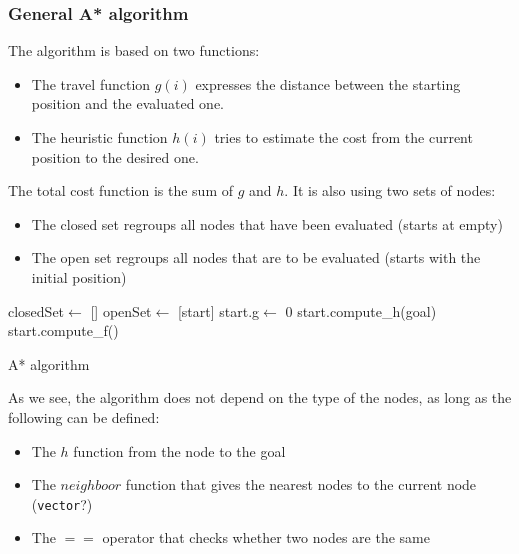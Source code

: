 \documentclass{ecnreport}
\begin{document}
 \subsubsection{General A* algorithm}
 The algorithm is based on two functions:
 \begin{itemize}
  \item The travel function $g(i)$ expresses the distance between the starting position and the evaluated one. 
  \item The heuristic function $h(i)$ tries to estimate the cost from the current position to the desired one. 
 \end{itemize}The total cost function is the sum of $g$ and $h$.
It is also using two sets of nodes:
\begin{itemize}
 \item The closed set regroups all nodes that have been evaluated (starts at empty)
 \item The open set regroups all nodes that are to be evaluated (starts with the initial position)
\end{itemize}


\begin{algorithm}[!t]
{}
closedSet$\gets$ []\;
openSet$\gets$ [start]\;
start.g$\gets$ 0\;
start.compute\_h(goal)\;
start.compute\_f()\;
\caption{A* algorithm}
\label{algo:smallpoly}
\end{algorithm}

As we see, the algorithm does not depend on the type of the nodes, as long as the following can be defined:
\begin{itemize}
 \item The $h$ function from the node to the goal
 \item The $neighboor$ function that gives the nearest nodes to the current node (\texttt{vector}?)
 \item The $==$ operator that checks whether two nodes are the same
\end{itemize}
\end{document}
